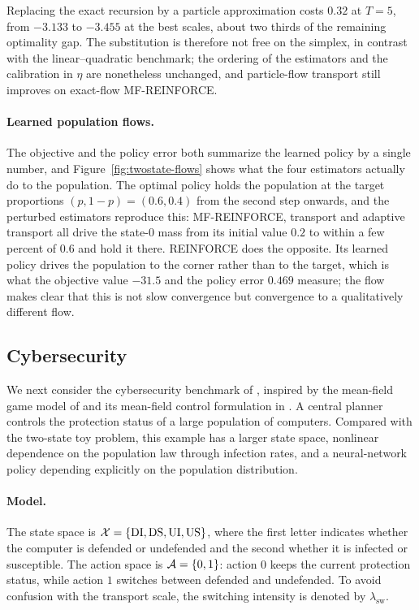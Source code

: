 Replacing the exact recursion by a particle approximation costs $0.32$ at $T=5$, from $-3.133$ to $-3.455$ at the best scales, about two thirds of the remaining optimality gap. The substitution is therefore not free on the simplex, in contrast with the linear--quadratic benchmark; the ordering of the estimators and the calibration in $\eta$ are nonetheless unchanged, and particle-flow transport still improves on exact-flow MF-REINFORCE.

\paragraph{Learned population flows.}
The objective and the policy error both summarize the learned policy by a single number, and Figure~\ref{fig:twostate-flows} shows what the four estimators actually do to the population. The optimal policy holds the population at the target proportions $(p,1-p)=(0.6,0.4)$ from the second step onwards, and the perturbed estimators reproduce this: MF-REINFORCE, transport and adaptive transport all drive the state-$0$ mass from its initial value $0.2$ to within a few percent of $0.6$ and hold it there. REINFORCE does the opposite. Its learned policy drives the population to the corner rather than to the target, which is what the objective value $-31.5$ and the policy error $0.469$ measure; the flow makes clear that this is not slow convergence but convergence to a qualitatively different flow.


\subsection{Cybersecurity}
\label{subsec:cybersecurity}

We next consider the cybersecurity benchmark of \cite{meunier2026model}, inspired by the mean-field game model of \cite{kolokoltsov2016mean} and its mean-field control formulation in \cite{carmona2023model}. A central planner controls the protection status of a large population of computers. Compared with the two-state toy problem, this example has a larger state space, nonlinear dependence on the population law through infection rates, and a neural-network policy depending explicitly on the population distribution.

\paragraph{Model.}
The state space is ${\cal X}=\{\mathrm{DI},\mathrm{DS},\mathrm{UI},\mathrm{US}\}$, where the first letter indicates whether the computer is defended or undefended and the second whether it is infected or susceptible. The action space is ${\cal A}=\{0,1\}$: action $0$ keeps the current protection status, while action $1$ switches between defended and undefended. To avoid confusion with the transport scale, the switching intensity is denoted by $\lambda_{\mathrm{sw}}$.

